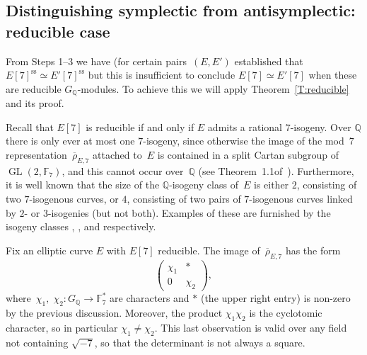 \documentclass[twoside,leqno,symbols-for-thanks, draft]{rmi}
\numberwithin{equation}{section}
\newcommand{\lmfdbeciso}[2]{\href{http://www.lmfdb.org/EllipticCurve/Q/#1/#2}{\text{\rm#1#2}}}
\newcommand{\F}{\mathbb{F}}
\newcommand{\Q}{\mathbb{Q}}
\newcommand{\rhobar}{{\overline{\rho}}}
\DeclareMathOperator{\sss}{ss}
\newcommand{\GL}{\operatorname{GL}}
\theoremstyle{remark}
\begin{document}
\subsection{Distinguishing symplectic from antisymplectic: reducible
  case}

From Steps 1--3 we have (for certain pairs~$(E,E')$ established that
$E[7]^{\sss} \simeq E'[7]^{\sss}$ but this is insufficient to conclude
$E[7] \simeq E'[7]$ when these are reducible $G_\Q$-modules.  To
achieve this we will apply Theorem~\ref{T:reducible} and its proof.

Recall that $E[7]$ is reducible if and only if $E$ admits a rational
$7$-isogeny.  Over $\Q$ there is only ever at most one $7$-isogeny,
since otherwise the image of the mod~$7$
representation~$\rhobar_{E,7}$ attached to~$E$ is contained in a split
Cartan subgroup of $\GL(2,\F_7)$, and this cannot occur over~$\Q$
(see Theorem~1.1of~\cite{GL}).  Furthermore, it is well known that the
size of the $\Q$-isogeny class of~$E$ is either $2$, consisting of two
$7$-isogenous curves, or $4$, consisting of two pairs of $7$-isogenous
curves linked by $2$-{} or $3$-isogenies (but not both). Examples of
these are furnished by the isogeny classes \lmfdbeciso{26}{b},
\lmfdbeciso{49}{a}, and \lmfdbeciso{162}{b} respectively.

Fix an elliptic curve $E$ with $E[7]$ reducible. 
The image
of~$\rhobar_{E,7}$ has the form
\[
  \begin{pmatrix}\chi_1&*\\0&\chi_2  \end{pmatrix},
\]
where~$\chi_1, \; \chi_2 : G_{\Q}\to\F_7^*$ are characters and $*$
(the upper right entry) is non-zero by the previous
discussion. Moreover, the product $\chi_1\chi_2$ is the cyclotomic
character, so in particular $\chi_1\not=\chi_2$. This last observation
is valid over any field not containing $\sqrt{-7}$, so that the
determinant is not always a square.
\end{document}
